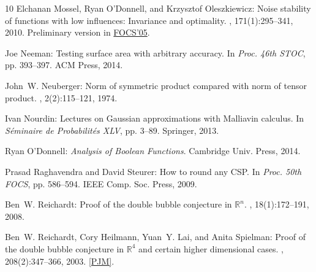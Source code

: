 \documentclass[11pt]{article}
\numberwithin{equation}{section}
\theoremstyle{definition}
\theoremstyle{plain}
\begin{document}
\begin{thebibliography}{10}
{\sc Elchanan Mossel, Ryan O'Donnell, and Krzysztof Oleszkiewicz}: {Noise
  stability of functions with low influences: Invariance and optimality}.
, 171(1):295--341, 2010.
\newblock Preliminary version in \href{https://doi.org/DOI:
  10.1109/SFCS.2005.53}{FOCS'05}.

{\sc Joe Neeman}: Testing surface area with arbitrary accuracy.
\newblock In {\em Proc. 46th STOC}, pp. 393--397. ACM Press, 2014.

{\sc John~W. Neuberger}: {Norm of symmetric product compared with norm of
  tensor product}.
, 2(2):115--121, 1974.
\newblock [\epfmtdoi{10.1080/03081087408817047}]

{\sc Ivan Nourdin}: Lectures on {G}aussian approximations with {M}alliavin
  calculus.
\newblock In {\em S{\'e}minaire de Probabilit{\'e}s XLV}, pp. 3--89. Springer,
  2013.

{\sc Ryan O'Donnell}: {\em Analysis of Boolean Functions}.
\newblock Cambridge Univ. Press, 2014.

{\sc Prasad Raghavendra and David Steurer}: How to round any {CSP}.
\newblock In {\em Proc. 50th FOCS}, pp. 586--594. IEEE Comp. Soc. Press, 2009.

{\sc Ben~W. Reichardt}: Proof of the double bubble conjecture in
  $\mathbb{R}^n$.
, 18(1):172--191, 2008.

{\sc Ben~W. Reichardt, Cory Heilmann, Yuan~Y. Lai, and Anita Spielman}: Proof
  of the double bubble conjecture in $\mathbb{R}^4$ and certain higher
  dimensional cases.
, 208(2):347--366, 2003.
\newblock \href{http://msp.berkeley.edu/pjm/2003/208-2/p09.xhtml}{[PJM]}.

\end{thebibliography}
\end{document}
